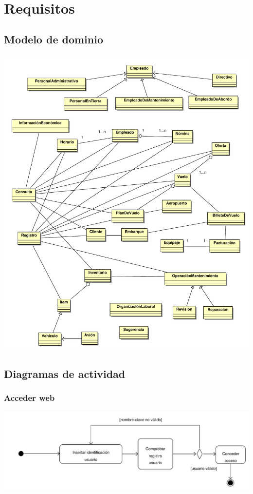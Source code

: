 \documentclass[11pt, a4paper, twoside, titlepage]{article}
\begin{document}
	\section{Requisitos}
		\subsection{Modelo de dominio}
				\begin{center}
					\hspace*{-.5cm}
					\includegraphics[scale=.722]{analisis/diagramas/modelodominio.pdf}
				\end{center}	
			\newpage
		\subsection{Diagramas de actividad}
			\subsubsection{Acceder web}
				\begin{center}
					\includegraphics[scale=.67]{analisis/diagramas/da_accederweb.pdf}
				\end{center}
\end{document}
